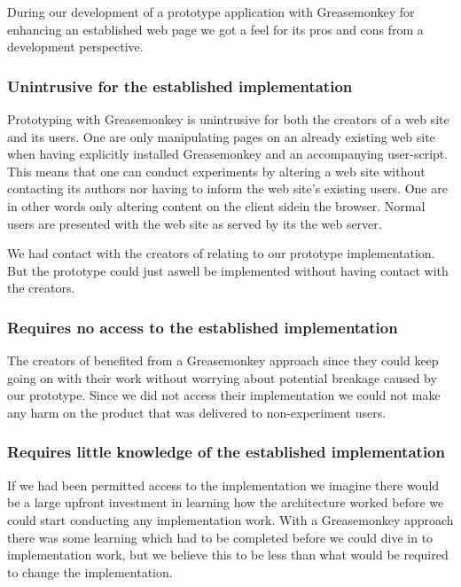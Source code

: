 \parabreak

During our development of a prototype application with Greasemonkey for
enhancing an established web page we got a feel for its pros and cons from a
development perspective.


\subsubsection{Unintrusive for the established implementation}

Prototyping with Greasemonkey is unintrusive for both the creators
of a web site and its users.  One are only manipulating
pages on an already existing web site when having explicitly installed
Greasemonkey and an accompanying user-script. This means that one can
conduct experiments by altering a web site without contacting its authors
nor having to inform the web site's existing users. One are in other words
only altering content on the client side\dash{}in the browser. Normal users
are presented with the web site as served by its the web server.

We had contact with the creators of \urort{} relating to our prototype
implementation. But the prototype could just aswell be implemented without
having contact with the creators.%

\subsubsection{Requires no access to the established implementation}

The creators of \urort{} benefited from a Greasemonkey approach since they
could keep going on with their work without worrying about potential breakage
caused by our prototype. Since we did not access their implementation we could
not make any harm on the product that was delivered to non-experiment users.

\subsubsection{Requires little knowledge of the established implementation}

If we had been permitted access to the \urort{} implementation we imagine
there would be a large upfront investment in learning how the \urort{}
architecture worked before we could start conducting any implementation work.
With a Greasemonkey approach there was some learning which had to be completed
before we could dive in to implementation work, but we believe this to be less
than what would be required to change the \urort{} implementation.

